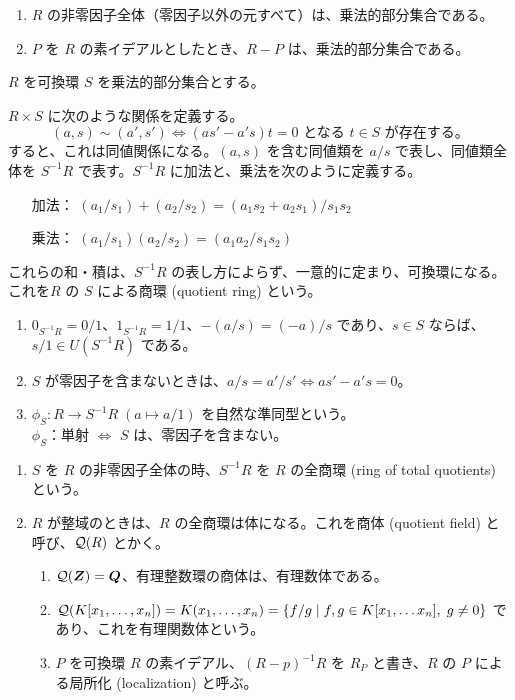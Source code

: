 \begin{eg}
\begin{enumerate}
\item $R$ の非零因子全体（零因子以外の元すべて）は、乗法的部分集合である。
\item $P$ を $R$ の素イデアルとしたとき、$R-P$ は、乗法的部分集合である。
\end{enumerate}
\end{eg}

$R$ を可換環 $S$ を乗法的部分集合とする。

$R\times S$ に次のような関係を定義する。
$$(a,s)\sim (a',s') \Leftrightarrow (as'-a's)t = 0 \mbox{ となる }t\in S\mbox{ が存在する。}$$
すると、これは同値関係になる。$(a,s)$ を含む同値類を $a/s$ で表し、同値類全体を $S^{-1}R$ で表す。$S^{-1}R$ に加法と、乗法を次のように定義する。
\begin{itemize}
\item[加法：] $(a_1/s_1) + (a_2/s_2) = (a_1s_2 + a_2s_1)/s_1s_2$
\item[乗法：] $(a_1/s_1)(a_2/s_2) = (a_1a_2/s_1s_2)$
\end{itemize}
これらの和・積は、$S^{-1}R$ の表し方によらず、一意的に定まり、可換環になる。これを$R$ の $S$ による商環 (quotient ring) という。

\note
\begin{enumerate}
\item $0_{S^{-1}R} = 0/1$、$1_{S^{-1}R} = 1/1$、$-(a/s) = (-a)/s$  であり、$s\in S$ ならば、$s/1\in U(S^{-1}R)$ である。
\item $S$ が零因子を含まないときは、$a/s = a'/s' \Leftrightarrow as'-a's = 0$。
\item $\phi_S:R \to S^{-1}R\;(a\mapsto a/1)$ を自然な準同型という。\\
$\phi_S$：単射 $\Leftrightarrow$ $S$ は、零因子を含まない。
\end{enumerate}

\begin{eg}
\begin{enumerate}
\item $S$ を $R$ の非零因子全体の時、$S^{-1}R$ を $R$ の全商環 (ring of total quotients) という。
\item $R$ が整域のときは、$R$ の全商環は体になる。これを商体 (quotient field) と呼び、${\cal Q}(R)$ とかく。
	\begin{enumerate}
	\item ${\cal Q}(\mbox{\boldmath $Z$}) = \mbox{\boldmath $Q$}$、有理整数環の商体は、有理数体である。
	\item ${\cal Q}(K[x_1,\ldots, x_n]) = K(x_1,\ldots, x_n) = \{f/g\mid f,g\in K[x_1,\ldots x_n], \;g\neq 0\}$ であり、これを有理関数体という。
	\item $P$ を可換環 $R$ の素イデアル、$(R-p)^{-1}R$ を $R_{P}$ と書き、$R$ の $P$ による局所化 (localization) と呼ぶ。
	\end{enumerate}
\end{enumerate}
\end{eg}

